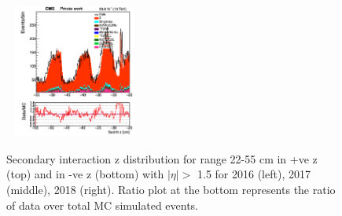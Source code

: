 \documentclass{cernatlasnote}
\begin{document}
\begin{figure}[htp]
 \includegraphics[width=4.6cm, height=4.4cm]{images/emu_channel/2018/18_Plots_for_r_z/SecInt_z_Selec_eta_minus_z_25_55_Linear.png}\\
 \caption{Secondary interaction z distribution for range 22-55 cm in +ve z (top) and in -ve z (bottom) with $|\eta|>$ 1.5 for 2016 (left), 2017 (middle), 2018 (right). Ratio plot at the bottom represents the ratio of data over total MC simulated events.}
 \label{fig:L0DATAMC}
  \end{figure}
\end{document}
